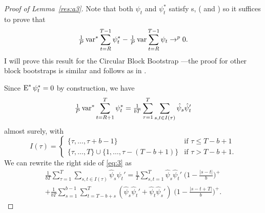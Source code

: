 \documentclass[12pt,fleqn]{article}
\begin{document}
\begin{proof}[Proof of Lemma~\ref{res:a3}]
  Note that both $\psi_t$ and $\psi_t^*$ satisfy
  \clt s, (\citealp[Theorem~2]{Jon:97} and
  \citealp[Theorem~1]{Cal:14}) so it suffices to prove that
  \[ \tfrac{ 1 }{ P } \operatorname{var}^* \sum_{t=R}^{T-1} \psi_t^*
  - \tfrac{ 1 }{ P } \operatorname{var} \sum_{t=R}^{T-1} \psi_t \to^p
  0. \] I will prove this result for the Circular Block Bootstrap
  \citep{PoR:92}---the proof for other block bootstraps is similar and
  follows as in \cite{Cal:14}.

  \newcommand{\su}{\tfrac{ 1 }{ b T } \sum_{ \tau = 1 }^{ T }%
  \sum_{ s, t \in I( \tau ) }}

  Since $\operatorname{E}^* \psi_t^* = 0$ by construction, we have
  \begin{equation}\label{eq:3}
  \tfrac{ 1 }{ P } \var^* \sum_{ t = R + 1 }^T \psi_t^*
  = \su \hat \psi_s \hat \psi_t'
  \end{equation}
  almost surely, with
  \begin{equation*}
    I(\tau) =
    \begin{cases}
      \{ \tau, \dots, \tau + b - 1 \} & \text{if } \tau \leq T - b + 1 \\
      \{ \tau, \dots, T \} \cup \{ 1, \dots, \tau - ( T - b + 1 ) \}
      & \text{if } \tau > T - b + 1.
    \end{cases}
  \end{equation*}
  We can rewrite the right side of \eqref{eq:3} as
  \begin{multline}\label{eq:6}
    \su \hat\psi_s \hat\psi_t'
    = \tfrac{1}{T} \sum_{s,t=1}^T \hat\psi_s \hat\psi_t' \;
      \big(1 - \tfrac{\lvert s - t \rvert}{b}\big)^+ \\
      + \tfrac{1}{bT} \sum_{s = 1}^{b - 1} \sum_{t = T - b + s}^{T}
        (\hat\psi_s \hat\psi_t' +
         \hat\psi_t \hat\psi_s') \;
        \big(1 - \tfrac{\lvert s - t + T\rvert}{b}\big)^+.
  \end{multline}


\end{proof}
\end{document}

